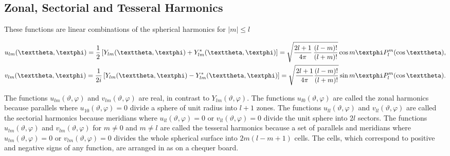 \subsection{Zonal, Sectorial and Tesseral Harmonics}\label{sec:5.1.6}
These functions are linear combinations of the spherical harmonics for $|m| \leq l$
\begin{corrected}
\begin{align}
& u_{l m}(\vartheta, \varphi)=\frac{1}{2}\left[Y_{l m}(\vartheta, \varphi)+Y_{l m}^{*}(\vartheta, \varphi)\right]=\sqrt{\frac{2 l+1}{4 \pi} \, \frac{(l-m)!}{(l+m)!}} \cos m \varphi P_{l}^{m}(\cos \vartheta),  \notag\\
& v_{l m}(\vartheta, \varphi)=\frac{1}{2 i}\left[Y_{l m}(\vartheta, \varphi)-Y_{l m}^{*}(\vartheta, \varphi)\right]=\sqrt{\frac{2 l+1}{4 \pi} \frac{(l-m)!}{(l+m)!}} \sin m \varphi P_{l}^{m}(\cos \vartheta) .\label{eq:5:1:14}
\end{align}
\end{corrected}
The functions $u_{l m}(\vartheta, \varphi)$ and $v_{l m}(\vartheta, \varphi)$ are real, in contrast to $Y_{l m}(\vartheta, \varphi)$. The functions $u_{l 0}(\vartheta, \varphi)$ are called the zonal harmonics because parallels where $u_{10}(\vartheta, \varphi)=0$ divide a sphere of unit radius into $l+1$ zones. The functions $u_{l l}(\vartheta, \varphi)$ and $v_{l l}(\vartheta, \varphi)$ are called the sectorial harmonics because meridians where $u_{l l}(\vartheta, \varphi)=0$ or $v_{l l}(\vartheta, \varphi)=0$ divide the unit sphere into $2 l$ sectors. The functions $u_{l m}(\vartheta, \varphi)$ and $v_{l m}(\vartheta, \varphi)$ for $m \neq 0$ and $m \neq l$ are called the tesseral harmonics because a set of parallels and meridians where $u_{l m}(\vartheta, \varphi)=0$ or $v_{l m}(\vartheta, \varphi)=0$ divides the whole spherical surface into $2 m(l-m+1)$ cells. The cells, which correspond to positive and negative signs of any function, are arranged in as on a chequer board.

